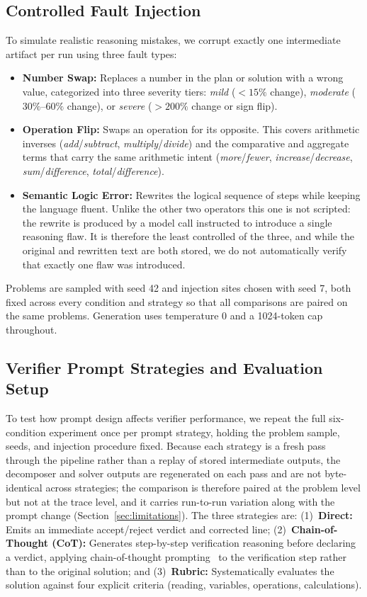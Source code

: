 \documentclass[11pt]{article}
\begin{document}
\subsection{Controlled Fault Injection}
\label{sec:injection}
To simulate realistic reasoning mistakes, we corrupt exactly one intermediate artifact per run using three fault types:
\begin{itemize}
    \item \textbf{Number Swap:} Replaces a number in the plan or solution with a wrong value, categorized into three severity tiers: \emph{mild} ($<15\%$ change), \emph{moderate} ($30\%$--$60\%$ change), or \emph{severe} ($>200\%$ change or sign flip).
    \item \textbf{Operation Flip:} Swaps an operation for its opposite. This covers arithmetic inverses (\emph{add}/\emph{subtract}, \emph{multiply}/\emph{divide}) and the comparative and aggregate terms that carry the same arithmetic intent (\emph{more}/\emph{fewer}, \emph{increase}/\emph{decrease}, \emph{sum}/\emph{difference}, \emph{total}/\emph{difference}).
    \item \textbf{Semantic Logic Error:} Rewrites the logical sequence of steps while keeping the language fluent. Unlike the other two operators this one is not scripted: the rewrite is produced by a model call instructed to introduce a single reasoning flaw. It is therefore the least controlled of the three, and while the original and rewritten text are both stored, we do not automatically verify that exactly one flaw was introduced.
\end{itemize}

Problems are sampled with seed 42 and injection sites chosen with seed 7, both fixed across
every condition and strategy so that all comparisons are paired on the same problems.
Generation uses temperature 0 and a 1024-token cap throughout.

\subsection{Verifier Prompt Strategies and Evaluation Setup}
\label{sec:strategies}
To test how prompt design affects verifier performance, we repeat the full six-condition
experiment once per prompt strategy, holding the problem sample, seeds, and injection
procedure fixed. Because each strategy is a fresh pass through the pipeline rather than a
replay of stored intermediate outputs, the decomposer and solver outputs are regenerated on
each pass and are not byte-identical across strategies; the comparison is therefore paired
at the problem level but not at the trace level, and it carries run-to-run variation along
with the prompt change (Section~\ref{sec:limitations}). The three strategies are:
(1)~\textbf{Direct:} Emits an immediate accept/reject verdict and corrected line;
(2)~\textbf{Chain-of-Thought (CoT):} Generates step-by-step verification reasoning before declaring a verdict, applying chain-of-thought prompting~\citep{wei2022cot} to the verification step rather than to the original solution; and
(3)~\textbf{Rubric:} Systematically evaluates the solution against four explicit criteria (reading, variables, operations, calculations).
\end{document}
